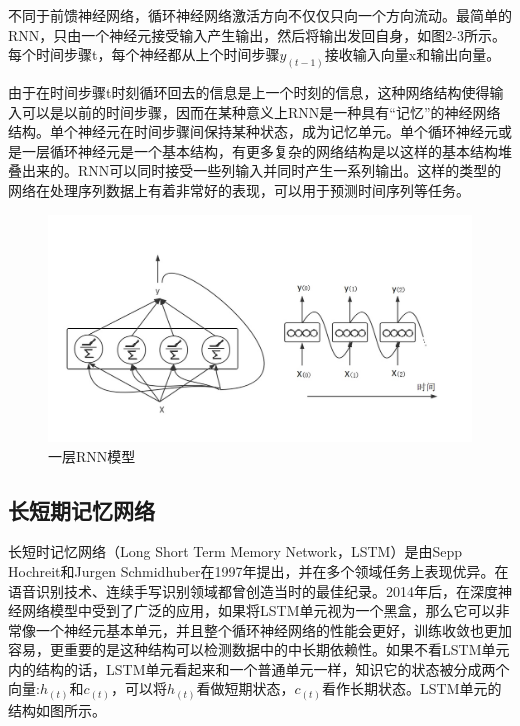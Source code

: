 \documentclass[winfonts,master,oneside,nobackinfo]{njuthesis}
\begin{document}
不同于前馈神经网络，循环神经网络激活方向不仅仅只向一个方向流动。最简单的RNN，只由一个神经元接受输入产生输出，然后将输出发回自身，如图2-3所示。每个时间步骤t，每个神经都从上个时间步骤$y _ { ( t - 1 ) }$接收输入向量x和输出向量。

由于在时间步骤t时刻循环回去的信息是上一个时刻的信息，这种网络结构使得输入可以是以前的时间步骤，因而在某种意义上RNN是一种具有“记忆”的神经网络结构。单个神经元在时间步骤间保持某种状态，成为记忆单元。单个循环神经元或是一层循环神经元是一个基本结构，有更多复杂的网络结构是以这样的基本结构堆叠出来的。RNN可以同时接受一些列输入并同时产生一系列输出。这样的类型的网络在处理序列数据上有着非常好的表现，可以用于预测时间序列等任务。

\begin{figure}[ht]
\centering
\begin{minipage}[t]{1\textwidth}
\includegraphics[width=1\textwidth]{./figure/一层RNN.jpg}
\caption{一层RNN模型}
\label{lab:1}
\end{minipage}
\end{figure}

\subsection{长短期记忆网络}

长短时记忆网络（Long Short Term Memory Network，LSTM）是由Sepp Hochreit和Jurgen Schmidhuber在1997年提出\cite{Hochreit}，并在多个领域任务上表现优异。在语音识别技术、连续手写识别领域都曾创造当时的最佳纪录。2014年后，在深度神经网络模型中受到了广泛的应用，如果将LSTM单元视为一个黑盒，那么它可以非常像一个神经元基本单元，并且整个循环神经网络的性能会更好，训练收敛也更加容易，更重要的是这种结构可以检测数据中的中长期依赖性。如果不看LSTM单元内的结构的话，LSTM单元看起来和一个普通单元一样，知识它的状态被分成两个向量:${ h } _ { ( t ) }$和$ { c } _ { ( t ) }$，可以将${ h } _ { ( t ) }$看做短期状态，${ c } _ { ( t ) }$看作长期状态。LSTM单元的结构如图所示。
\end{document}
